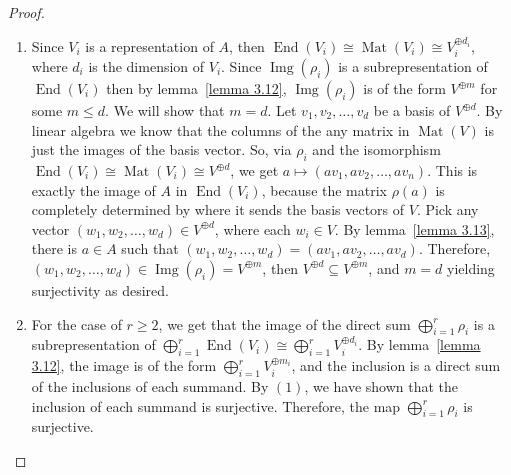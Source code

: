 \begin{proof}
    \begin{enumerate}
        \item Since $V_i$ is a representation of $A$, then $\operatorname{End}(V_i) \cong \operatorname{Mat}(V_i) \cong V_i^{\oplus d_i}$, where $d_i$ is the dimension of $V_i$. Since $\operatorname{Img}(\rho_i)$ is a subrepresentation of $\operatorname{End}(V_i)$ then by lemma~\ref{lemma 3.12}, $\operatorname{Img}(\rho_i)$ is of the form $V^{\oplus m}$ for some $m \leq d$. We will show that $m = d$. Let $v_1, v_2, \dots , v_d$ be a basis of $V^{\oplus d}$. By linear algebra we know that the columns of the any matrix in $\operatorname{Mat}(V)$ is just the images of the basis vector. 
        So, via $\rho_i$ and the isomorphism $\operatorname{End}(V_i) \cong \operatorname{Mat}(V_i) \cong  V^{\oplus d}$,
        we get $a \mapsto (av_1, av_2 , \dots, av_n)$. This is exactly the image of $A$ in $\operatorname{End}(V_i)$, because the matrix $\rho(a)$ is completely determined by where it sends the basis vectors of $V$. 
        Pick any vector $(w_1,w_2, \dots, w_d) \in V^{\oplus d}$, where each $w_i \in V$. By lemma~\ref{lemma 3.13}, there is $a \in A$ such that $(w_1, w_2 , \dots , w_d) = (av_1, av_2, \dots , av_d)$. Therefore, $(w_1, w_2, \dots, w_d) \in \operatorname{Img}(\rho_i) = V^{\oplus m}$, then $V^{\oplus d} \subseteq V^{\oplus m}$, and $m =d$ yielding surjectivity as desired.
    
\item For the case of $r \geq 2$, we get that the image of the direct sum $\displaystyle\bigoplus_{i =1}^r \rho_i$ is a subrepresentation of $\bigoplus_{i=1}^r \operatorname{End}(V_i) \cong \bigoplus_{i=1}^r V_i^{\oplus d_i}$. By lemma~\ref{lemma 3.12}, the image is of the form $\bigoplus_{i=1}^r V_i^{\oplus m_i}$, and the inclusion is a direct sum of the inclusions of each summand. By $(1)$, we have shown that the inclusion of each summand is surjective. Therefore, the map $\displaystyle\bigoplus_{i =1}^r \rho_i$ is surjective.
    \end{enumerate}
\end{proof}
  
